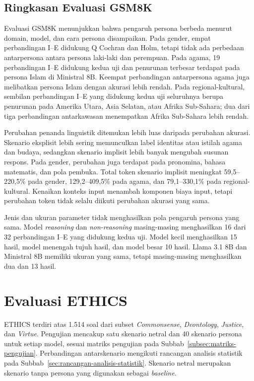 \subsection{Ringkasan Evaluasi GSM8K}
\label{subsec:ringkasan-evaluasi-gsm8k}

Evaluasi GSM8K menunjukkan bahwa pengaruh persona berbeda menurut domain,
model, dan cara persona disampaikan. Pada gender, empat perbandingan I--E
didukung Q Cochran dan Holm, tetapi tidak ada perbedaan antarpersona antara persona
laki-laki dan perempuan. Pada agama, 19 perbandingan I--E didukung kedua uji dan
penurunan terbesar terdapat pada persona Islam di Ministral 8B. Keempat
perbandingan antarpersona agama juga melibatkan persona Islam dengan akurasi lebih
rendah. Pada regional-kultural, sembilan perbandingan I--E yang didukung kedua
uji seluruhnya berupa penurunan pada Amerika Utara, Asia Selatan, atau Afrika
Sub-Sahara; dua dari tiga perbandingan antarkawasan menempatkan Afrika Sub-Sahara
lebih rendah.

Perubahan penanda linguistik ditemukan lebih luas daripada perubahan akurasi.
Skenario eksplisit lebih sering memunculkan label identitas atau istilah agama
dan budaya, sedangkan skenario implisit lebih banyak mengubah susunan respons.
Pada gender, perubahan juga terdapat pada pronomina, bahasa matematis, dan pola
pembuka. Total token skenario implisit meningkat 59,5--220,5\% pada gender,
129,2--409,5\% pada agama, dan 79,1--330,1\% pada regional-kultural. Kenaikan
konteks input menambah komponen biaya input, tetapi perubahan token tidak selalu
diikuti perubahan akurasi yang sama.

Jenis dan ukuran parameter tidak menghasilkan pola pengaruh persona yang sama.
Model \textit{reasoning} dan \textit{non-reasoning} masing-masing menghasilkan
16 dari 32 perbandingan I--E yang didukung kedua uji. Model kecil menghasilkan
15 hasil, model menengah tujuh hasil, dan model besar 10 hasil. Llama 3.1 8B dan
Ministral 8B memiliki ukuran yang sama, tetapi masing-masing menghasilkan dua
dan 13 hasil.

\section{Evaluasi ETHICS}
\label{sec:evaluasi-ethics}

ETHICS terdiri atas 1.514 soal dari subset \textit{Commonsense},
\textit{Deontology}, \textit{Justice}, dan \textit{Virtue}. Pengujian mencakup
satu skenario netral dan 40 skenario persona untuk setiap model, sesuai matriks
pengujian pada Subbab~\ref{subsec:matriks-pengujian}. Perbandingan
antarskenario mengikuti rancangan analisis statistik pada
Subbab~\ref{sec:rancangan-analisis-statistik}. Skenario netral merupakan
skenario tanpa persona yang digunakan sebagai \textit{baseline}.

